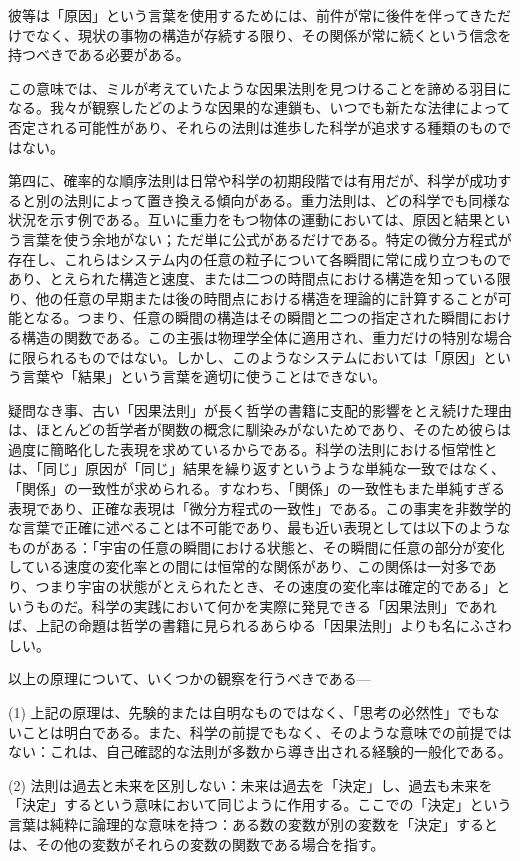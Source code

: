 \documentclass[a4paper,11pt,openany]{ltjsbook}
\begin{document}
彼等は「原因」という言葉を使用するためには、前件が常に後件を伴ってきただけでなく、現状の事物の構造が存続する限り、その関係が常に続くという信念を持つべきである必要がある。

この意味では、ミルが考えていたような因果法則を見つけることを諦める羽目になる。我々が観察したどのような因果的な連鎖も、いつでも新たな法律によって否定される可能性があり、それらの法則は進歩した科学が追求する種類のものではない。

第四に、確率的な順序法則は日常や科学の初期段階では有用だが、科学が成功すると別の法則によって置き換える傾向がある。重力法則は、どの科学でも同様な状況を示す例である。互いに重力をもつ物体の運動においては、原因と結果という言葉を使う余地がない；ただ単に公式があるだけである。特定の微分方程式が存在し、これらはシステム内の任意の粒子について各瞬間に常に成り立つものであり、とえられた構造と速度、または二つの時間点における構造を知っている限り、他の任意の早期または後の時間点における構造を理論的に計算することが可能となる。つまり、任意の瞬間の構造はその瞬間と二つの指定された瞬間における構造の関数である。この主張は物理学全体に適用され、重力だけの特別な場合に限られるものではない。しかし、このようなシステムにおいては「原因」という言葉や「結果」という言葉を適切に使うことはできない。

疑問なき事、古い「因果法則」が長く哲学の書籍に支配的影響をとえ続けた理由は、ほとんどの哲学者が関数の概念に馴染みがないためであり、そのため彼らは過度に簡略化した表現を求めているからである。科学の法則における恒常性とは、「同じ」原因が「同じ」結果を繰り返すというような単純な一致ではなく、「関係」の一致性が求められる。すなわち、「関係」の一致性もまた単純すぎる表現であり、正確な表現は「微分方程式の一致性」である。この事実を非数学的な言葉で正確に述べることは不可能であり、最も近い表現としては以下のようなものがある：「宇宙の任意の瞬間における状態と、その瞬間に任意の部分が変化している速度の変化率との間には恒常的な関係があり、この関係は一対多であり、つまり宇宙の状態がとえられたとき、その速度の変化率は確定的である」というものだ。科学の実践において何かを実際に発見できる「因果法則」であれば、上記の命題は哲学の書籍に見られるあらゆる「因果法則」よりも名にふさわしい。

以上の原理について、いくつかの観察を行うべきである—

(1) 上記の原理は、先験的または自明なものではなく、「思考の必然性」でもないことは明白である。また、科学の前提でもなく、そのような意味での前提ではない：これは、自己確認的な法則が多数から導き出される経験的一般化である。

(2) 法則は過去と未来を区別しない：未来は過去を「決定」し、過去も未来を「決定」するという意味において同じように作用する。ここでの「決定」という言葉は純粋に論理的な意味を持つ：ある数の変数が別の変数を「決定」するとは、その他の変数がそれらの変数の関数である場合を指す。
\end{document}

